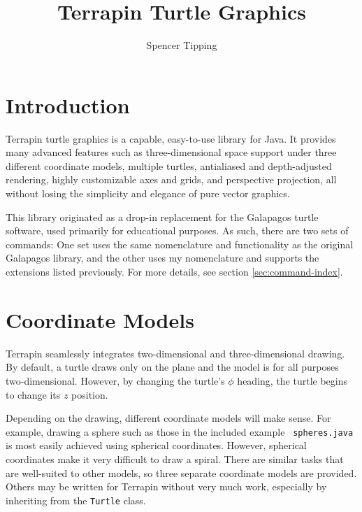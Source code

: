 \documentclass{article}
\begin{document}
  \title{Terrapin Turtle Graphics}
  \author{Spencer Tipping}
  \date{}
  \maketitle

  \tableofcontents

  \section{Introduction}
    \label{sec:introduction}

    Terrapin turtle graphics is a capable, easy-to-use library for Java. It
    provides many advanced features such as three-dimensional space support
    under three different coordinate models, multiple turtles, antialiased and
    depth-adjusted rendering, highly customizable axes and grids, and
    perspective projection, all without losing the simplicity and elegance of
    pure vector graphics.

    This library originated as a drop-in replacement for the Galapagos turtle
    software, used primarily for educational purposes. As such, there are two
    sets of commands: One set uses the same nomenclature and functionality as
    the original Galapagos library, and the other uses my nomenclature and
    supports the extensions listed previously. For more details, see section
    \ref{sec:command-index}.

  \section{Coordinate Models}
    \label{sec:coordinate-models}

    Terrapin seamlessly integrates two-dimensional and three-dimensional
    drawing. By default, a turtle draws only on the plane and the model is for
    all purposes two-dimensional. However, by changing the turtle's $\phi$
    heading, the turtle begins to change its $z$ position.

    Depending on the drawing, different coordinate models will make sense. For
    example, drawing a sphere such as those in the included example {\tt
    spheres.java} is most easily achieved using spherical coordinates. However,
    spherical coordinates make it very difficult to draw a spiral. There are
    similar tasks that are well-suited to other models, so three separate
    coordinate models are provided. Others may be written for Terrapin without
    very much work, especially by inheriting from the {\tt Turtle} class.
\end{document}
